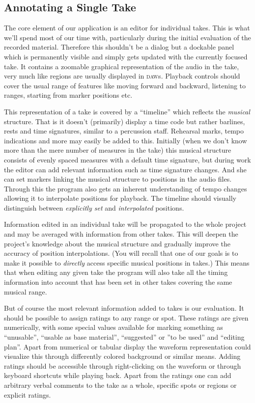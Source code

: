 \documentclass[11pt,a4paper]{article}
\begin{document}
\subsection{Annotating a Single Take}
The core element of our application is an editor for individual takes.
This is what we'll spend most of our time with, particularly during the initial evaluation of the recorded material.
Therefore this shouldn't be a dialog but a dockable panel which is permanently visible and simply gets updated with the currently focused take.
It contains a zoomable graphical representation of the audio in the take, very much like regions are usually displayed in \textsc{daw}s.
Playback controls should cover the usual range of features like moving forward and backward, listening to ranges, starting from marker positions etc.

This representation of a take is covered by a “timeline” which reflects the \emph{musical} structure.
That is it doesn't (primarily) display a time code but rather barlines, rests and time signatures, similar to a percussion staff.
Rehearsal marks, tempo indications and more may easily be added to this.
Initially (when we don't know more than the mere number of measures in the take) this musical structure consists of evenly spaced measures with a default time signature, but during work the editor can add relevant information such as time signature changes.
And she can set markers linking the musical structure to positions in the audio files.
Through this the program also gets an inherent understanding of tempo changes allowing it to interpolate positions for playback.
The timeline should visually distinguish between \emph{explicitly set} and \emph{interpolated} positions.

Information edited in an individual take will be propagated to the whole project and may be averaged with information from other takes.
This will deepen the project's knowledge about the musical structure and gradually improve the accuracy of position interpolations.
(You will recall that one of our goals is to make it possible to \emph{directly} access specific musical positions in takes.)
This means that when editing any given take the program will also take all the timing information into account that has been set in other takes covering the same musical range.

But of course the most relevant information added to takes is our evaluation.
It should be possible to assign ratings to any range or spot.
These ratings are given numerically, with some special values available for marking something as “unusable”, “usable as base material”, “suggested” or ”to be used” and “editing plan”.
Apart from numerical or tabular display the waveform representation could visualize this through differently colored background or similar means.
Adding ratings should be accessible through right-clicking on the waveform or through keyboard shortcuts while playing back.
Apart from the ratings one can add arbitrary verbal comments to the take as a whole, specific spots or regions or explicit ratings.
\end{document}
